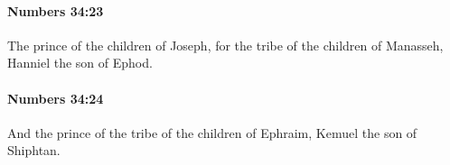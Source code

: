 		\paragraph{Numbers 34:23} %
			\label{NUMBERS-34-23}

			The prince of the children of Joseph, for the tribe of the children of Manasseh, Hanniel the son of Ephod.


		\paragraph{Numbers 34:24} %
			\label{NUMBERS-34-24}

			And the prince of the tribe of the children of Ephraim, Kemuel the son of Shiphtan.


